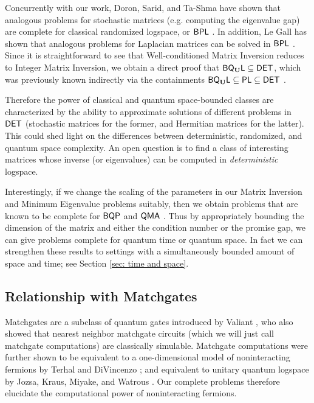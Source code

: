 \documentclass[11pt]{article}
\theoremstyle{definition}
\theoremstyle{remark}
\newcommand\DET{{\sf{DET}}}
\newcommand\PLclass{{\sf{PL}}}
\newcommand\QMA{{\sf{QMA}}}
\newcommand\BQP{{\sf{BQP}}}
\newcommand\BPL{{\sf{BPL}}}
\newcommand{\classfont}{\sf}
\newcommand{\Unitary}{\mathbf{U}}
\newcommand{\unitaryBQL}{{\classfont{BQ}_\Unitary\classfont{L}}}
\begin{document}
Concurrently with our work, Doron, Sarid, and Ta-Shma have shown that analogous problems for stochastic matrices (e.g. computing the eigenvalue gap) are complete for classical randomized logspace, or $\BPL$ \cite{dt15,dst16}. In addition, Le Gall has shown that analogous problems for Laplacian matrices can be solved in $\BPL$ \cite{legall16}. Since it is straightforward to see that Well-conditioned Matrix Inversion reduces to Integer Matrix Inversion, we obtain a direct proof that $\unitaryBQL\subseteq\DET$, which was previously known indirectly via the containments $\unitaryBQL\subseteq\PLclass\subseteq\DET$ \cite{Watrous03,Borodin84}.

Therefore the power of classical and quantum space-bounded classes are characterized by the ability to approximate solutions of different problems in $\DET$ (stochastic matrices for the former, and Hermitian matrices for the latter). This could shed light on the differences between deterministic, randomized, and quantum space complexity. An open question is to find a class of interesting matrices whose inverse (or eigenvalues) can be computed in \emph{deterministic} logspace.

Interestingly, if we change the scaling of the parameters in our Matrix Inversion and Minimum Eigenvalue problems suitably, then we obtain problems that are known to be complete for $\BQP$ \cite{HHL} and $\QMA$ \cite{ksv02,at03}.
Thus by appropriately bounding the dimension of the matrix and either the condition number or the promise gap, we can give problems complete for quantum time or quantum space. In fact we can strengthen these results to settings with a simultaneously bounded amount of space and time; see Section \ref{sec: time and space}. 
\subsection{Relationship with Matchgates} \label{sec: matchgates}

Matchgates are a subclass of quantum gates introduced by Valiant \cite{Val02SIComp}, who also showed that nearest neighbor matchgate circuits (which we will just call matchgate computations) are classically simulable. Matchgate computations were further shown to be equivalent to a one-dimensional model of noninteracting fermions by Terhal and DiVincenzo \cite{TerDiV02PRA}; and equivalent to unitary quantum logspace by Jozsa, Kraus, Miyake, and Watrous \cite{JozKraMiyWat10RSPA}. Our complete problems therefore elucidate the computational power of noninteracting fermions.
\end{document}
